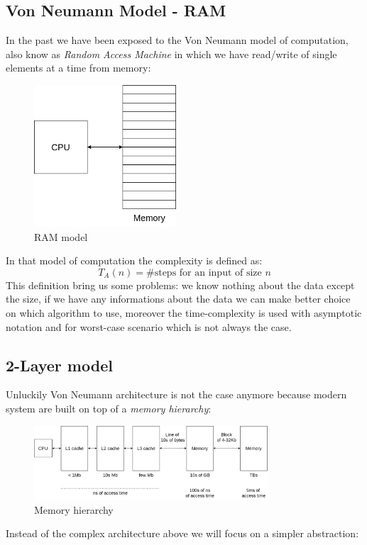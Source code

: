 \subsection{Von Neumann Model - RAM}
In the past we have been exposed to the Von Neumann model of computation, also know as \emph{Random Access Machine} in which we have read/write of single elements at a time from memory:
\begin{figure}[H]
    \centering
    \includegraphics[width=150pt]{images/1_Introduction/RAM_model.png}
    \caption{RAM model}
\end{figure}

In that model of computation the complexity is defined as: 
$$ T_A(n) = \# \text{steps for an input of size } n $$
This definition bring us some problems: we know nothing about the data except the size, if we have any informations about the data we can make better choice on which algorithm to use, moreover the time-complexity is used with asymptotic notation and for worst-case scenario which is not always the case.

\subsection{2-Layer model}
Unluckily Von Neumann architecture is not the case anymore because modern system are built on top of a \emph{memory hierarchy}:
\begin{figure}[H]
    \centering
    \includegraphics[width=330px]{images/1_Introduction/memory_hierarchy.png}
    \caption{Memory hierarchy}
\end{figure}

Instead of the complex architecture above we will focus on a simpler abstraction:

